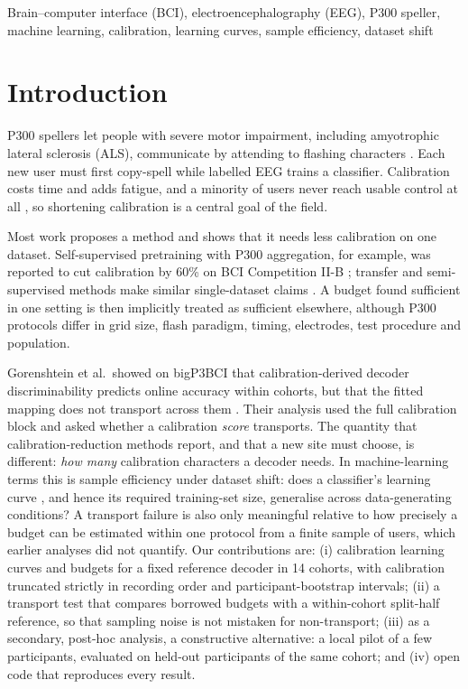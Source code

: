 \documentclass[conference]{IEEEtran}
\begin{document}
\begin{IEEEkeywords}
Brain--computer interface (BCI), electroencephalography (EEG), P300 speller, machine learning, calibration, learning curves, sample efficiency, dataset shift
\end{IEEEkeywords}

\section{Introduction}
P300 spellers let people with severe motor impairment, including amyotrophic lateral sclerosis (ALS), communicate by attending to flashing characters \cite{farwell1988}. Each new user must first copy-spell while labelled EEG trains a classifier. Calibration costs time and adds fatigue, and a minority of users never reach usable control at all \cite{guger2009}, so shortening calibration is a central goal of the field.

Most work proposes a method and shows that it needs less calibration on one dataset. Self-supervised pretraining with P300 aggregation, for example, was reported to cut calibration by 60\% on BCI Competition II-B \cite{hong2025}; transfer and semi-supervised methods make similar single-dataset claims \cite{gao2023,chen2026,wu2022}. A budget found sufficient in one setting is then implicitly treated as sufficient elsewhere, although P300 protocols differ in grid size, flash paradigm, timing, electrodes, test procedure and population.

Gorenshtein et al.\ showed on bigP3BCI that calibration-derived decoder discriminability predicts online accuracy within cohorts, but that the fitted mapping does not transport across them \cite{gorenshtein2026}. Their analysis used the full calibration block and asked whether a calibration \emph{score} transports. The quantity that calibration-reduction methods report, and that a new site must choose, is different: \emph{how many} calibration characters a decoder needs. In machine-learning terms this is sample efficiency under dataset shift: does a classifier's learning curve \cite{viering2023}, and hence its required training-set size, generalise across data-generating conditions? A transport failure is also only meaningful relative to how precisely a budget can be estimated within one protocol from a finite sample of users, which earlier analyses did not quantify. Our contributions are: (i) calibration learning curves and budgets for a fixed reference decoder in 14 cohorts, with calibration truncated strictly in recording order and participant-bootstrap intervals; (ii) a transport test that compares borrowed budgets with a within-cohort split-half reference, so that sampling noise is not mistaken for non-transport; (iii) as a secondary, post-hoc analysis, a constructive alternative: a local pilot of a few participants, evaluated on held-out participants of the same cohort; and (iv) open code that reproduces every result.
\end{document}
